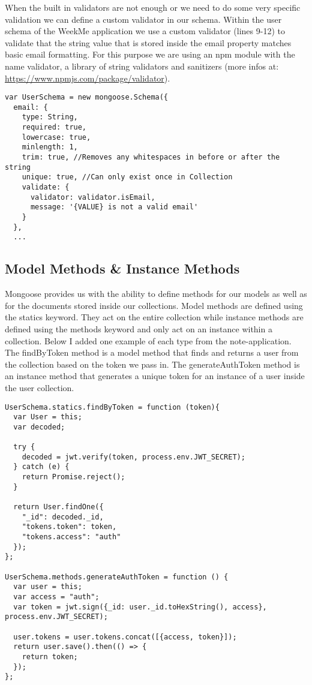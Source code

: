 \documentclass[11pt]{article}
\begin{document}
When the built in validators are not enough or we need to do some very specific validation we can define a custom validator in our schema. Within the user schema of the WeekMe application we use a custom validator (lines 9-12) to validate that the string value that is stored inside the email property matches basic email formatting. For this purpose we are using an npm module with the name validator, a library of string validators and sanitizers (more infos at: \url{https://www.npmjs.com/package/validator}).    


\begin{lstlisting}
var UserSchema = new mongoose.Schema({
  email: {
    type: String,
    required: true,
    lowercase: true,
    minlength: 1,
    trim: true, //Removes any whitespaces in before or after the string
    unique: true, //Can only exist once in Collection
    validate: {
      validator: validator.isEmail,
      message: '{VALUE} is not a valid email'
    }
  },
  ...
\end{lstlisting}
 




\subsection{Model Methods \& Instance Methods}
Mongoose provides us with the ability to define methods for our models as well as for the documents stored inside our collections. Model methods are defined using the statics keyword. They act on the entire collection while instance methods are defined using the methods keyword and only act on an instance within a collection. Below I added one example of each type from the note-application. The findByToken method is a model method that finds and returns a user from the collection based on the token we pass in. The generateAuthToken method is an instance method that generates a unique token for an instance of a user inside the user collection. 

\begin{lstlisting}
UserSchema.statics.findByToken = function (token){
  var User = this;
  var decoded; 

  try {
    decoded = jwt.verify(token, process.env.JWT_SECRET);
  } catch (e) {
    return Promise.reject(); 
  }

  return User.findOne({
    "_id": decoded._id,
    "tokens.token": token,
    "tokens.access": "auth"
  });
};

UserSchema.methods.generateAuthToken = function () { 
  var user = this; 
  var access = "auth";
  var token = jwt.sign({_id: user._id.toHexString(), access}, process.env.JWT_SECRET);
  
  user.tokens = user.tokens.concat([{access, token}]);
  return user.save().then(() => {
    return token;
  });
};
\end{lstlisting}
\end{document}
